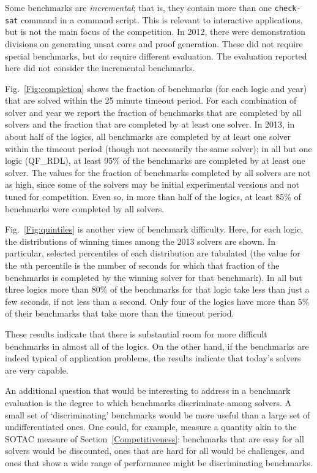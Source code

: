 \documentclass[smallcondensed]{svjour3}
\begin{document}
Some benchmarks are {\em incremental}; that is, they contain more than one {\tt check-sat} command in a command script. This is relevant to interactive applications, but is not the main focus of the competition. In 2012, there were demonstration divisions on generating unsat cores and proof generation. These did not require special benchmarks, but do require different evaluation. The evaluation reported here did not consider the incremental benchmarks.


Fig.~\ref{Fig:completion} shows the fraction of benchmarks (for each logic and year) that are solved within the 25 minute timeout period. For each combination of solver and year we report the fraction of benchmarks that are completed by all solvers and the fraction that are completed by at least one solver. In 2013, in about half of the logics, all benchmarks are completed by at least one solver within the timeout period (though not necessarily the same solver); in all but one logic (QF\_RDL), at least 95\% of the benchmarks are completed by at least one solver. The values for the fraction of benchmarks completed by all solvers are not as high, since some of the solvers may be initial experimental versions and not tuned for competition. Even so, in more than half of the logics, at least 85\% of benchmarks were completed by all solvers.

Fig.~\ref{Fig:quintiles} is another view of benchmark difficulty. Here, for each logic, the distributions of winning times among the 2013 solvers are shown. In particular, selected
percentiles of each distribution are tabulated (the value for the {\em n}th percentile is the number of seconds for which that fraction of the benchmarks is completed by the winning solver for that benchmark). In all but three logics more than 80\% of the benchmarks for that logic take less than just a few seconds, if not less than a second. Only four of the logics have more than 5\% of their benchmarks that take more than the timeout period.
 
These results indicate that there is substantial room for more difficult benchmarks in almost all of the logics. On the other hand, if the benchmarks are indeed typical of application problems, the results indicate that today's solvers are very capable.

An additional question that would be interesting to address in a benchmark evaluation
 is the degree to which benchmarks discriminate among solvers. A small set of `discriminating' benchmarks would be more useful than a large set of undifferentiated ones. One could, for example, measure a quantity akin to the SOTAC measure of Section~\ref{Competitiveness}: benchmarks that are easy for all solvers would be discounted, ones that are hard for all would be challenges, and ones that show a wide range of performance might be discriminating benchmarks.
\end{document}
